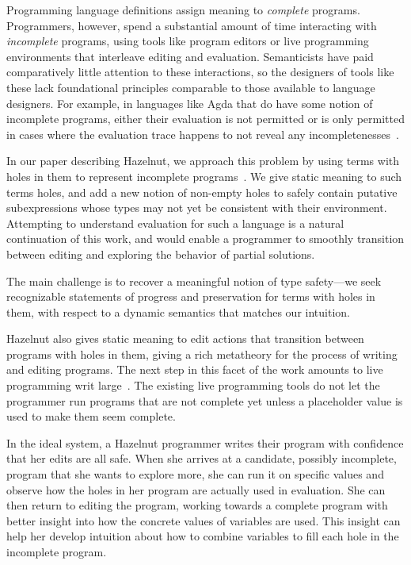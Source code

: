 Programming language definitions assign meaning to \textit{complete}
programs. Programmers, however, spend a substantial amount of time
interacting with \textit{incomplete} programs, using tools like program
editors or live programming environments that interleave editing and
evaluation. Semanticists have paid comparatively little attention to these
interactions, so the designers of tools like these lack foundational
principles comparable to those available to language designers. For
example, in languages like Agda that do have some notion of incomplete
programs, either their evaluation is not permitted or is only permitted in
cases where the evaluation trace happens to not reveal any
incompletenesses~\cite{norell:thesis}.

In our paper describing Hazelnut, we approach this problem by using terms
with holes in them to represent incomplete
programs~\cite{hazelnut:popl}. We give static meaning to such terms holes,
and add a new notion of non-empty holes to safely contain putative
subexpressions whose types may not yet be consistent with their
environment. Attempting to understand evaluation for such a language is a
natural continuation of this work, and would enable a programmer to
smoothly transition between editing and exploring the behavior of partial
solutions.

The main challenge is to recover a meaningful notion of type safety---we
seek recognizable statements of progress and preservation for terms with
holes in them, with respect to a dynamic semantics that matches our
intuition.

Hazelnut also gives static meaning to edit actions that transition between
programs with holes in them, giving a rich metatheory for the process of
writing and editing programs. The next step in this facet of the work
amounts to live programming writ large~\cite{burckhardt2013s}. The existing
live programming tools do not let the programmer run programs that are not
complete yet unless a placeholder value is used to make them seem complete.

In the ideal system, a Hazelnut programmer writes their program with
confidence that her edits are all safe. When she arrives at a candidate,
possibly incomplete, program that she wants to explore more, she can run it
on specific values and observe how the holes in her program are actually
used in evaluation. She can then return to editing the program, working
towards a complete program with better insight into how the concrete values
of variables are used. This insight can help her develop intuition about
how to combine variables to fill each hole in the incomplete program.
